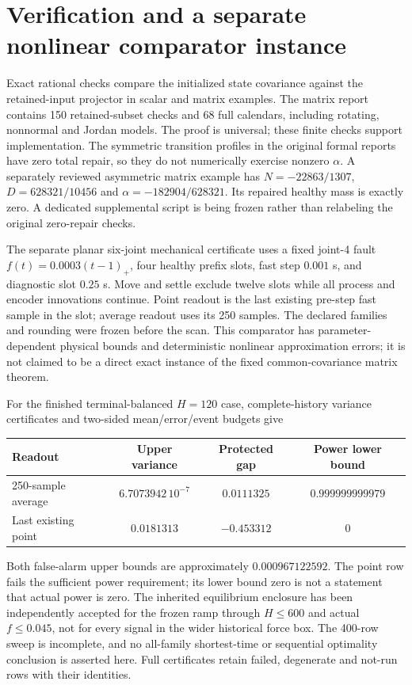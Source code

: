 \documentclass[11pt]{article}
\begin{document}
\section{Verification and a separate nonlinear comparator instance}
Exact rational checks compare the initialized state covariance against the
retained-input projector in scalar and matrix examples. The matrix report
contains 150 retained-subset checks and 68 full calendars, including rotating,
nonnormal and Jordan models. The proof is universal; these finite checks
support implementation. The symmetric transition profiles in the original
formal reports have zero total repair, so they do not numerically exercise
nonzero $\alpha$. A separately reviewed asymmetric matrix example has
$N=-22863/1307$, $D=628321/10456$ and $\alpha=-182904/628321$.
Its repaired healthy mass is exactly zero. A dedicated supplemental script
is being frozen rather than relabeling the original zero-repair checks.

The separate planar six-joint mechanical certificate uses a fixed joint-4
fault $f(t)=0.0003(t-1)_+$, four healthy prefix slots, fast step $0.001$ s,
and diagnostic slot $0.25$ s. Move and settle exclude twelve slots while
all process and encoder innovations continue. Point readout is the last
existing pre-step fast sample in the slot; average readout uses its 250 samples.
The declared families and rounding were frozen before the scan.
This comparator has parameter-dependent physical bounds and deterministic
nonlinear approximation errors; it is not claimed to be a direct exact
instance of the fixed common-covariance matrix theorem.

For the finished terminal-balanced $H=120$ case, complete-history variance
certificates and two-sided mean/error/event budgets give
\begin{center}
\begin{tabular}{lccc}
\toprule
Readout & Upper variance & Protected gap & Power lower bound\\
\midrule
250-sample average & $6.7073942\,10^{-7}$ & $0.0111325$ & $0.999999999979$\\
Last existing point & $0.0181313$ & $-0.453312$ & $0$\\
\bottomrule
\end{tabular}
\end{center}
Both false-alarm upper bounds are approximately $0.000967122592$.
The point row fails the sufficient power requirement; its lower bound zero is
not a statement that actual power is zero. The inherited equilibrium enclosure
has been independently accepted for the frozen ramp through $H\le600$
and actual $f\le0.045$, not for every signal in the wider historical force box.
The 400-row sweep is incomplete, and no all-family shortest-time or sequential
optimality conclusion is asserted here. Full certificates retain failed,
degenerate and not-run rows with their identities.
\end{document}
